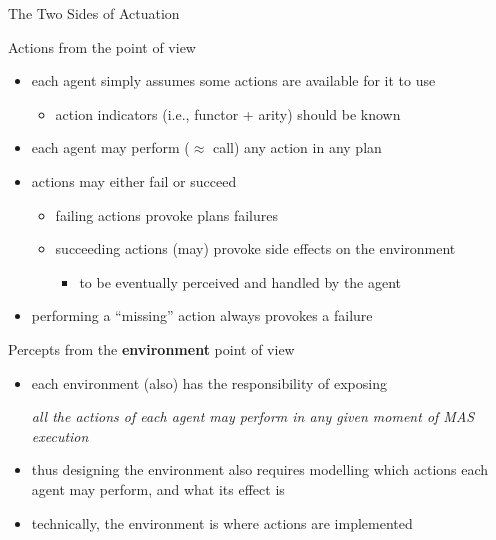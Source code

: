 \documentclass[presentation]{beamer}\mode<presentation>{\usetheme{AMSBolognaFC}}
\begin{document}
\begin{frame}[c,allowframebreaks]{The Two Sides of Actuation}
    
    \begin{block}{Actions from the  point of view}
        \begin{itemize}
            \item each agent simply \alert{assumes} some actions are available for it to use
            \begin{itemize}
                \item action \alert{indicators} (i.e., functor + arity) should be known
            \end{itemize}
            
            \item each agent may \alert{perform} ($\approx$ call) any action in any plan
            
            \item actions may either \alert{fail or succeed}
            \begin{itemize}
                \item failing actions provoke \alert{plans failures}
                \item succeeding actions (may) provoke \alert{side effects} on the environment
                \begin{itemize}
                    \item to be eventually perceived and handled by the agent
                \end{itemize}
            \end{itemize}
            
            \item performing a ``missing'' action always provokes a failure
        \end{itemize}
    \end{block}
    
    \framebreak
    
    \begin{block}{Percepts from the \textbf{environment} point of view}
        \begin{itemize}
            \item each environment (also) has the \alert{responsibility} of exposing 
            \begin{center}\small\itshape
                \alert{all} the actions of \alert{each} agent may perform in \alert{any} given moment of MAS execution
            \end{center}
            
            \item thus designing the environment also requires modelling \alert{which} actions each agent may perform, and what its \alert{effect} is
            
            \item technically, the environment is where actions are implemented
        \end{itemize}
    \end{block}
    
\end{frame} 
\end{document}
